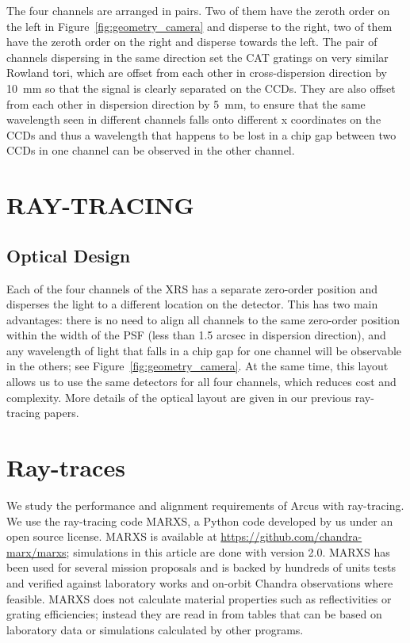 \documentclass[12pt]{spieman}  %
\begin{document}
\begin{spacing}{2}
The four channels are arranged in pairs. Two of them have the zeroth order on the left in Figure~\ref{fig:geometry_camera} and disperse to the right, two of them have the zeroth order on the right and disperse towards the left. The pair of channels dispersing in the same direction set the CAT gratings on very similar Rowland tori, which are offset from each other in cross-dispersion direction by 10~mm so that the signal is clearly separated on the CCDs. They are also offset from each other in dispersion direction by 5~mm, to ensure that the same wavelength seen in different channels falls onto different x coordinates on the CCDs and thus a wavelength that happens to be lost in a chip gap between two CCDs in one channel can be observed in the other channel.

\section{RAY-TRACING}
\label{sect:raytracing}
\subsection{Optical Design}
\label{sect:design}

Each of the four channels of the XRS has a separate zero-order position and disperses the light to a different location on the detector. This has two main advantages: there is no need to align all channels to the same zero-order position within the width of the PSF (less than 1.5 arcsec in dispersion direction), and any wavelength of light that falls in a chip gap for one channel will be observable in the others; see Figure~\ref{fig:geometry_camera}. At the same time, this layout allows us to use the same detectors for all four channels, which reduces cost and complexity. More details of the optical layout are given in our previous ray-tracing papers\cite{10.1117/12.2273011,10.1117/12.2312678,DTRS}.

\section{Ray-traces}
We study the performance and alignment requirements of Arcus with ray-tracing. We use the ray-tracing code MARXS\cite{2017AJ....154..243G,marxs2.0}, a Python code developed by us under an open source license. MARXS is available at \url{https://github.com/chandra-marx/marxs}; simulations in this article are done with version 2.0. MARXS has been used for several mission proposals and is backed by hundreds of units tests and verified against laboratory works and on-orbit Chandra observations where feasible. MARXS does not calculate material properties such as reflectivities or grating efficiencies; instead they are read in from tables that can be based on laboratory data or simulations calculated by other programs.


\end{spacing}
\end{document}
